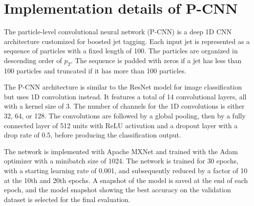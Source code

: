 \documentclass[aps,prd,longbibliography,reprint,amsmath,amssymb,amsfonts]{revtex4-1}
\begin{document}
\section{Implementation details of P-CNN}
\label{app:arch-p-cnn}


The particle-level convolutional neural network (P-CNN) \cite{CMS-DP-2017-049} is a deep 1D CNN architecture customized for boosted jet tagging. Each input jet is represented as a sequence of particles with a fixed length of 100. The particles are organized in descending order of $p_T$. The sequence is padded with zeros if a jet has less than 100 particles and truncated if it has more than 100 particles. 

The P-CNN architecture is similar to the ResNet model \cite{he2016deep,DBLP:journals/corr/HeZR016} for image classification but uses 1D convolution instead. It features a total of 14 convolutional layers, all with a kernel size of 3. The number of channels for the 1D convolutions is either 32, 64, or 128. The convolutions are followed by a global pooling, then by a fully connected layer of 512 units with ReLU activation and a dropout layer with a drop rate of 0.5, before producing the classification output. 

The network is implemented with Apache MXNet and trained with the Adam optimizer with a minibatch size of 1024. The network is trained for 30 epochs, with a starting learning rate of 0.001, and subsequently reduced by a factor of 10 at the 10th and 20th epochs. A snapshot of the model is saved at the end of each epoch, and the model snapshot showing the best accuracy on the validation dataset is selected for the final evaluation. 
 
\end{document}
